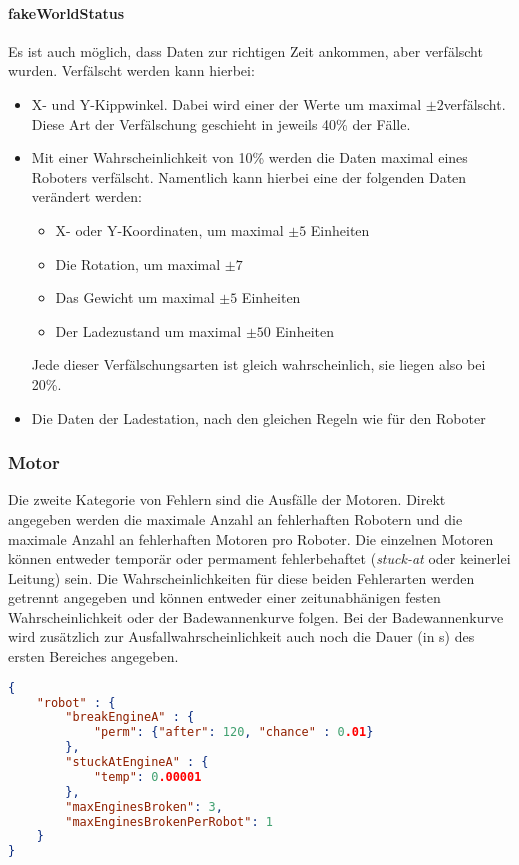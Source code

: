 \paragraph{fakeWorldStatus} Es ist auch m{\"{o}}glich, dass Daten zur richtigen Zeit ankommen, aber
    verf{\"{a}}lscht wurden. Verf{\"{a}}lscht werden kann hierbei:
	\begin{itemize}
		\item X- und Y-Kippwinkel. Dabei wird einer der Werte um maximal $\pm 2$\textdegree verf{\"{a}}lscht.
			Diese Art der Verf{\"{a}}lschung geschieht in jeweils 40\% der F{\"{a}}lle.
		\item Mit einer Wahrscheinlichkeit von 10\% werden die Daten maximal eines Roboters verf{\"{a}}lscht.
			Namentlich kann hierbei eine der folgenden Daten ver{\"{a}}ndert werden:
			\begin{itemize}
				\item X- oder Y-Koordinaten, um maximal $\pm 5$ Einheiten
				\item Die Rotation, um maximal $\pm 7$\textdegree
				\item Das Gewicht um maximal $\pm 5$ Einheiten
				\item Der Ladezustand um maximal $\pm 50$ Einheiten
			\end{itemize}
			Jede dieser Verf{\"{a}}lschungsarten ist gleich wahrscheinlich, sie liegen also bei 20\%.
		\item Die Daten der Ladestation, nach den gleichen Regeln wie f{\"{u}}r den Roboter
	\end{itemize}

\subsubsection{Motor}
Die zweite Kategorie von Fehlern sind die Ausf{\"{a}}lle der Motoren. Direkt angegeben werden die maximale
Anzahl an fehlerhaften Robotern und die maximale Anzahl an fehlerhaften Motoren pro Roboter.
Die einzelnen Motoren k{\"{o}}nnen entweder tempor{\"{a}}r oder permament fehlerbehaftet (\textit{stuck-at}
oder keinerlei Leitung) sein. Die Wahrscheinlichkeiten f{\"{u}}r diese beiden Fehlerarten werden getrennt
angegeben und k{\"{o}}nnen entweder einer zeitunabh{\"{a}}nigen festen Wahrscheinlichkeit oder der
Badewannenkurve folgen. Bei der Badewannenkurve wird zus{\"{a}}tzlich zur Ausfallwahrscheinlichkeit auch
noch die Dauer (in s) des ersten Bereiches angegeben.
\begin{lstlisting}[frame=single, language=json] 
{
	"robot" : {
		"breakEngineA" : {
			"perm": {"after": 120, "chance" : 0.01}
		},
		"stuckAtEngineA" : {
			"temp": 0.00001
		},
		"maxEnginesBroken": 3,
		"maxEnginesBrokenPerRobot": 1
	}
}
\end{lstlisting}

